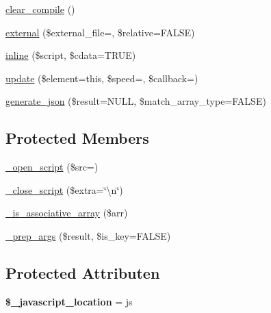 \begin{DoxyCompactItemize}
\mbox{\hyperlink{class_c_i___javascript_a4e3a7e7ffc20e8f578a0d66f52def10d}{clear\+\_\+compile}} ()
\item 
\mbox{\hyperlink{class_c_i___javascript_a1b1cfdf25c7ceae03d2c60019bdf59b9}{external}} (\$external\+\_\+file=\textquotesingle{}\textquotesingle{}, \$relative=F\+A\+L\+SE)
\item 
\mbox{\hyperlink{class_c_i___javascript_aeecd5d85370a4037c00dba82960816e1}{inline}} (\$script, \$cdata=T\+R\+UE)
\item 
\mbox{\hyperlink{class_c_i___javascript_a97c369870fff724c8bbdae779a715446}{update}} (\$element=\textquotesingle{}this\textquotesingle{}, \$speed=\textquotesingle{}\textquotesingle{}, \$callback=\textquotesingle{}\textquotesingle{})
\item 
\mbox{\hyperlink{class_c_i___javascript_ae60bb50a1e4cbbce1f6c29a73fad5e07}{generate\+\_\+json}} (\$result=N\+U\+LL, \$match\+\_\+array\+\_\+type=F\+A\+L\+SE)
\end{DoxyCompactItemize}
\subsection*{Protected Members}
\begin{DoxyCompactItemize}
\item 
\mbox{\hyperlink{class_c_i___javascript_ab90b7bf672ff305aa302ced7c8255762}{\+\_\+open\+\_\+script}} (\$src=\textquotesingle{}\textquotesingle{})
\item 
\mbox{\hyperlink{class_c_i___javascript_a83a39b1edd6e0ec9bd6c93de99a0d4d8}{\+\_\+close\+\_\+script}} (\$extra=\char`\"{}\textbackslash{}n\char`\"{})
\item 
\mbox{\hyperlink{class_c_i___javascript_aa37c9b1b7e2898fe21a0deaace09b156}{\+\_\+is\+\_\+associative\+\_\+array}} (\$arr)
\item 
\mbox{\hyperlink{class_c_i___javascript_a10b9bc25e0d84b0dacb1bd7b09f3c0be}{\+\_\+prep\+\_\+args}} (\$result, \$is\+\_\+key=F\+A\+L\+SE)
\end{DoxyCompactItemize}
\subsection*{Protected Attributen}
\begin{DoxyCompactItemize}
\item 
\mbox{\label{class_c_i___javascript_a1ade0f4214435ac22074136db49cc257}} 
{\bfseries \$\+\_\+javascript\+\_\+location} = \textquotesingle{}js\textquotesingle{}
\end{DoxyCompactItemize}


